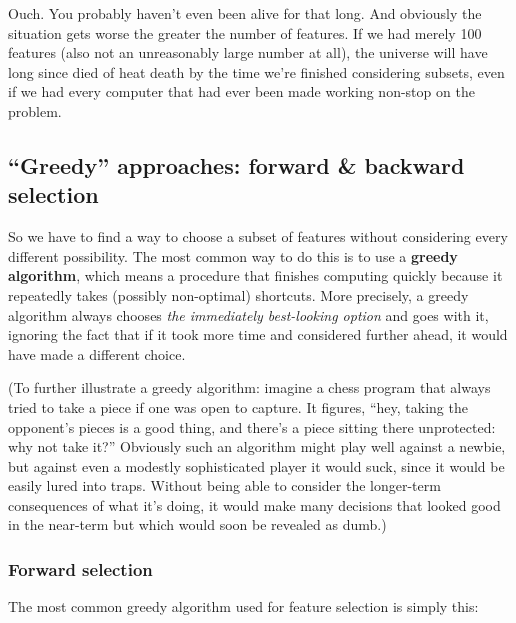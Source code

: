 \documentclass[12pt]{article}
\begin{document}
\normalsize
Ouch. You probably haven't even been alive for that long. And obviously the
situation gets worse the greater the number of features. If we had merely 100
features (also not an unreasonably large number at all), the universe will
have long since died of heat death by the time we're finished considering
subsets, even if we had every computer that had ever been made working
non-stop on the problem.

\subsection{``Greedy'' approaches: forward \& backward selection}

So we have to find a way to choose a subset of features without considering
every different possibility. The most common way to do this is to use a
\textbf{greedy algorithm}, which means a procedure that finishes computing
quickly because it repeatedly takes (possibly non-optimal) shortcuts. More
precisely, a greedy algorithm always chooses \textit{the immediately
best-looking option} and goes with it, ignoring the fact that if it took more
time and considered further ahead, it would have made a different choice.

(To further illustrate a greedy algorithm: imagine a chess program that always
tried to take a piece if one was open to capture. It figures, ``hey, taking
the opponent's pieces is a good thing, and there's a piece sitting there
unprotected: why not take it?'' Obviously such an algorithm might play well
against a newbie, but against even a modestly sophisticated player it would
suck, since it would be easily lured into traps. Without being able to
consider the longer-term consequences of what it's doing, it would make many
decisions that looked good in the near-term but which would soon be revealed
as dumb.)

\subsubsection{Forward selection}

The most common greedy algorithm used for feature selection is simply this:
\end{document}
